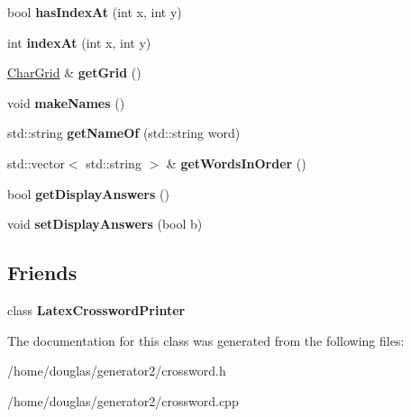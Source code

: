 \begin{DoxyCompactItemize}
\item 
bool {\bfseries has\+Index\+At} (int x, int y)\hypertarget{classCrossword_a08dacf55351f4cb07a7bd98bb17e40bc}{}\label{classCrossword_a08dacf55351f4cb07a7bd98bb17e40bc}

\item 
int {\bfseries index\+At} (int x, int y)\hypertarget{classCrossword_abb2f7fd9ec23c7543da4a031193dca9d}{}\label{classCrossword_abb2f7fd9ec23c7543da4a031193dca9d}

\item 
\hyperlink{classCharGrid}{Char\+Grid} \& {\bfseries get\+Grid} ()\hypertarget{classCrossword_a0e2eb976712cc19d99123ea00ca5a36b}{}\label{classCrossword_a0e2eb976712cc19d99123ea00ca5a36b}

\item 
void {\bfseries make\+Names} ()\hypertarget{classCrossword_adc255a20cadea9ddba13f8fc992da2a5}{}\label{classCrossword_adc255a20cadea9ddba13f8fc992da2a5}

\item 
std\+::string {\bfseries get\+Name\+Of} (std\+::string word)\hypertarget{classCrossword_afe1e74a939f5f0883a511f328e64b41d}{}\label{classCrossword_afe1e74a939f5f0883a511f328e64b41d}

\item 
std\+::vector$<$ std\+::string $>$ \& {\bfseries get\+Words\+In\+Order} ()\hypertarget{classCrossword_afff0c113751d2ffaf62358c91f400df9}{}\label{classCrossword_afff0c113751d2ffaf62358c91f400df9}

\item 
bool {\bfseries get\+Display\+Answers} ()\hypertarget{classCrossword_a90aac72a9259270a0d30d0acf760977c}{}\label{classCrossword_a90aac72a9259270a0d30d0acf760977c}

\item 
void {\bfseries set\+Display\+Answers} (bool b)\hypertarget{classCrossword_a4a5616c7b81bcc6902b79cc3634e047a}{}\label{classCrossword_a4a5616c7b81bcc6902b79cc3634e047a}

\end{DoxyCompactItemize}
\subsection*{Friends}
\begin{DoxyCompactItemize}
\item 
class {\bfseries Latex\+Crossword\+Printer}\hypertarget{classCrossword_ae525bd3dd94c2b1845a8d8fc7aae8ef7}{}\label{classCrossword_ae525bd3dd94c2b1845a8d8fc7aae8ef7}

\end{DoxyCompactItemize}


The documentation for this class was generated from the following files\+:\begin{DoxyCompactItemize}
\item 
/home/douglas/generator2/crossword.\+h\item 
/home/douglas/generator2/crossword.\+cpp\end{DoxyCompactItemize}
